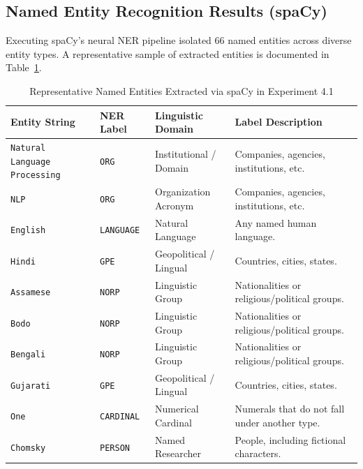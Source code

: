 \subsection{Named Entity Recognition Results (spaCy)}
Executing spaCy's neural NER pipeline isolated 66 named entities across diverse entity types. A representative sample of extracted entities is documented in Table~\ref{tab:exp4_ner_sample}.
\begin{table}[H]
\centering
\small
\caption{Representative Named Entities Extracted via spaCy in Experiment 4.1}
\label{tab:exp4_ner_sample}
\begin{tabularx}{\textwidth}{lllX}
\toprule
\textbf{Entity String} & \textbf{NER Label} & \textbf{Linguistic Domain} & \textbf{Label Description} \\
\midrule
\texttt{Natural Language Processing} & \texttt{ORG} & Institutional / Domain & Companies, agencies, institutions, etc. \\
\texttt{NLP} & \texttt{ORG} & Organization Acronym & Companies, agencies, institutions, etc. \\
\texttt{English} & \texttt{LANGUAGE} & Natural Language & Any named human language. \\
\texttt{Hindi} & \texttt{GPE} & Geopolitical / Lingual & Countries, cities, states. \\
\texttt{Assamese} & \texttt{NORP} & Linguistic Group & Nationalities or religious/political groups. \\
\texttt{Bodo} & \texttt{NORP} & Linguistic Group & Nationalities or religious/political groups. \\
\texttt{Bengali} & \texttt{NORP} & Linguistic Group & Nationalities or religious/political groups. \\
\texttt{Gujarati} & \texttt{GPE} & Geopolitical / Lingual & Countries, cities, states. \\
\texttt{One} & \texttt{CARDINAL} & Numerical Cardinal & Numerals that do not fall under another type. \\
\texttt{Chomsky} & \texttt{PERSON} & Named Researcher & People, including fictional characters. \\
\bottomrule
\end{tabularx}
\end{table}

